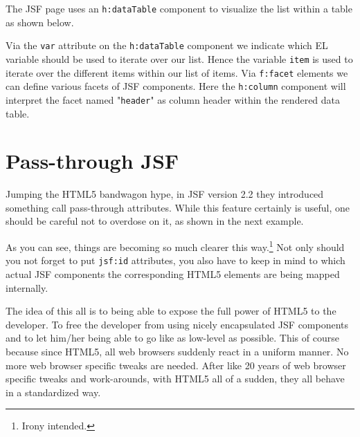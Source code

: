 The JSF page uses an \texttt{h:dataTable} component to visualize the list within a table as shown below.

Via the \texttt{var} attribute on the \texttt{h:dataTable} component we indicate which EL variable should be used to iterate over our list.
Hence the variable \texttt{item} is used to iterate over the different items within our list of items.
Via \texttt{f:facet} elements we can define various facets of JSF components.
Here the \texttt{h:column} component will interpret the facet named "\texttt{header}" as column header within the rendered data table.

\section{Pass-through JSF}
Jumping the HTML5 bandwagon hype, in JSF version 2.2 they introduced something call pass-through attributes.
While this feature certainly is useful, one should be careful not to overdose on it, as shown in the next example.

As you can see, things are becoming so much clearer this way.\footnote{Irony intended.}
Not only should you not forget to put \texttt{jsf:id} attributes,
you also have to keep in mind to which actual JSF components the corresponding HTML5 elements are being mapped internally.

The idea of this all is to being able to expose the full power of HTML5 to the developer.
To free the developer from using nicely encapsulated JSF components and to let him/her being able to go like as low-level as possible.
This of course because since HTML5, all web browsers suddenly react in a uniform manner.
No more web browser specific tweaks are needed.
After like 20 years of web browser specific tweaks and work-arounds, with HTML5 all of a sudden, they all behave in a standardized way.


